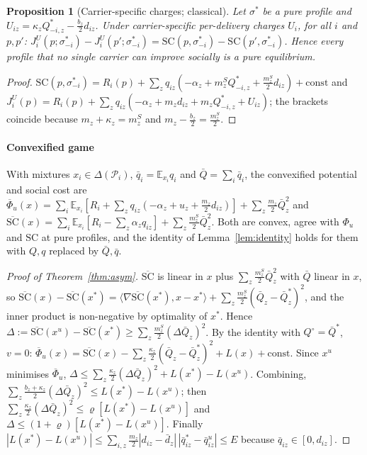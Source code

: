 \documentclass[preprint,12pt]{elsarticle}
\newtheorem{proposition}[theorem]{Proposition}
\theoremstyle{definition}
\theoremstyle{remark}
\newcommand{\E}{\mathbb{E}}
\newcommand{\ip}[2]{\langle #1,#2\rangle}
\begin{document}
\begin{proposition}[Carrier-specific charges; classical]\label{prop:pers}
Let $\sigma^*$ be a pure profile and $U_{iz}=\kappa_zQ^*_{-i,z}-\tfrac{b_z}{2}d_{iz}$. Under carrier-specific per-delivery charges $U_i$, for all $i$ and $p,p'$: $J^U_i(p;\sigma^*_{-i})-J^U_i(p';\sigma^*_{-i})=\mathrm{SC}(p,\sigma^*_{-i})-\mathrm{SC}(p',\sigma^*_{-i})$. Hence every profile that no single carrier can improve socially is a pure equilibrium.
\end{proposition}
\begin{proof}
$\mathrm{SC}(p,\sigma^*_{-i})=R_i(p)+\sum_zq_{iz}(-\alpha_z+m^S_zQ^*_{-i,z}+\tfrac{m^S_z}{2}d_{iz})+\text{const}$ and $J^U_i(p)=R_i(p)+\sum_zq_{iz}(-\alpha_z+m_zd_{iz}+m_zQ^*_{-i,z}+U_{iz})$; the brackets coincide because $m_z+\kappa_z=m^S_z$ and $m_z-\tfrac{b_z}{2}=\tfrac{m^S_z}{2}$.
\end{proof}

\paragraph{Convexified game} With mixtures $x_i\in\Delta(\mathcal P_i)$, $\bar q_i=\E_{x_i}q_i$ and $\bar Q=\sum_i\bar q_i$, the convexified potential and social cost are
$\overline\Phi_u(x)=\sum_i\E_{x_i}[R_i+\sum_zq_{iz}(-\alpha_z+u_z+\tfrac{m_z}{2}d_{iz})]+\sum_z\tfrac{m_z}{2}\bar Q_z^2$ and
$\overline{\mathrm{SC}}(x)=\sum_i\E_{x_i}[R_i-\sum_z\alpha_zq_{iz}]+\sum_z\tfrac{m^S_z}{2}\bar Q_z^2$. Both are convex, agree with $\Phi_u$ and $\mathrm{SC}$ at pure profiles, and the identity of Lemma~\ref{lem:identity} holds for them with $Q,q$ replaced by $\bar Q,\bar q$.

\begin{proof}[Proof of Theorem~\ref{thm:asym}]
$\overline{\mathrm{SC}}$ is linear in $x$ plus $\sum_z\tfrac{m^S_z}{2}\bar Q_z^2$ with $\bar Q$ linear in $x$, so $\overline{\mathrm{SC}}(x)-\overline{\mathrm{SC}}(x^*)=\ip{\nabla\overline{\mathrm{SC}}(x^*)}{x-x^*}+\sum_z\tfrac{m^S_z}{2}(\bar Q_z-\bar Q^*_z)^2$, and the inner product is non-negative by optimality of $x^*$. Hence $\Delta:=\overline{\mathrm{SC}}(x^u)-\overline{\mathrm{SC}}(x^*)\ge\sum_z\tfrac{m^S_z}{2}(\Delta\bar Q_z)^2$. By the identity with $Q^\circ=\bar Q^*$, $v=0$: $\overline\Phi_u(x)=\overline{\mathrm{SC}}(x)-\sum_z\tfrac{\kappa_z}{2}(\bar Q_z-\bar Q^*_z)^2+L(x)+\text{const}$. Since $x^u$ minimises $\overline\Phi_u$, $\Delta\le\sum_z\tfrac{\kappa_z}{2}(\Delta\bar Q_z)^2+L(x^*)-L(x^u)$. Combining, $\sum_z\tfrac{b_z+\kappa_z}{2}(\Delta\bar Q_z)^2\le L(x^*)-L(x^u)$; then $\sum_z\tfrac{\kappa_z}{2}(\Delta\bar Q_z)^2\le\varrho[L(x^*)-L(x^u)]$ and $\Delta\le(1+\varrho)[L(x^*)-L(x^u)]$. Finally $|L(x^*)-L(x^u)|\le\sum_{i,z}\tfrac{m_z}{2}|d_{iz}-\bar d_z|\,|\bar q^*_{iz}-\bar q^u_{iz}|\le E$ because $\bar q_{iz}\in[0,d_{iz}]$.
\end{proof}
\end{document}
